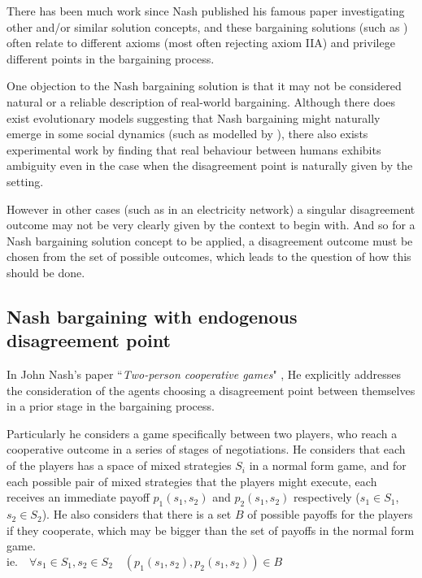 There has been much work since Nash published his famous paper \citep{nash1} investigating other and/or similar solution concepts, and these bargaining solutions (such as \cite{smorodinsky,tempered,anbarci2002comparing}) often relate to different axioms (most often rejecting axiom IIA) and privilege different points in the bargaining process.

One objection to the Nash bargaining solution is that it may not be considered natural or a reliable description of real-world bargaining.
Although there does exist evolutionary models suggesting that Nash bargaining might naturally emerge in some social dynamics (such as modelled by \cite{articlechoakihiko}), there also exists experimental work by \cite{KROLL2014261} finding that real behaviour between humans exhibits ambiguity even in the case when the disagreement point is naturally given by the setting.

However in other cases (such as in an electricity network) a singular disagreement outcome may not be very clearly given by the context to begin with.
And so for a Nash bargaining solution concept to be applied, a disagreement outcome must be chosen from the set of possible outcomes, which leads to the question of how this should be done.

\subsection{Nash bargaining with endogenous disagreement point}\label{subsec:nash_bargaining_endogenous}

In John Nash's paper ``\textit{Two-person cooperative games}" \citep{nash2}, He explicitly addresses the consideration of the agents choosing a disagreement point between themselves in a prior stage in the bargaining process.

Particularly he considers a game specifically between two players, who reach a cooperative outcome in a series of stages of negotiations.
He considers that each of the players has a space of mixed strategies $S_i$ in a normal form game, and for each possible pair of mixed strategies that the players might execute, each receives an immediate payoff $p_1(s_1,s_2)$ and $p_2(s_1,s_2)$ respectively ($s_1\in S_1$, $s_2\in S_2$).
He also considers that there is a set $B$ of possible payoffs for the players if they cooperate, which may be bigger than the set of payoffs in the normal form game.\\
$\text{ie.}\quad \forall s_1\in S_1,s_2\in S_2 \quad (p_1(s_1,s_2), p_2(s_1,s_2)) \in B$

